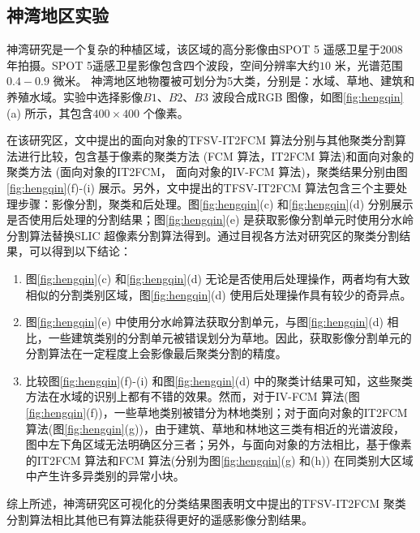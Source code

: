 \subsection{神湾地区实验}
\label{subsec::chap04-4-1}
神湾研究是一个复杂的种植区域，该区域的高分影像由SPOT 5 遥感卫星于2008 年拍摄。SPOT 5遥感卫星影像包含四个波段，空间分辨率大约$10$ 米，光谱范围$0.4-0.9$ 微米。 神湾地区地物覆被可划分为5大类，分别是：水域、草地、建筑和养殖水域。实验中选择影像$B1$、$B2$、$B3$ 波段合成RGB 图像，如图\ref{fig:hengqin}(a) 所示，其包含$400 \times 400$ 个像素。

在该研究区，文中提出的面向对象的TFSV-IT2FCM 算法分别与其他聚类分割算法进行比较，包含基于像素的聚类方法 (FCM 算法，IT2FCM 算法)和面向对象的聚类方法 (面向对象的IT2FCM， 面向对象的IV-FCM 算法)，聚类结果分别由图\ref{fig:hengqin}(f)-(i) 展示。另外，文中提出的TFSV-IT2FCM 算法包含三个主要处理步骤：影像分割，聚类和后处理。图\ref{fig:hengqin}(c) 和\ref{fig:hengqin}(d) 分别展示是否使用后处理的分割结果；图\ref{fig:hengqin}(e) 是获取影像分割单元时使用分水岭分割算法替换SLIC 超像素分割算法得到。通过目视各方法对研究区的聚类分割结果，可以得到以下结论：

\begin{enumerate}[(1)]
    \item 图\ref{fig:hengqin}(c) 和\ref{fig:hengqin}(d) 无论是否使用后处理操作，两者均有大致相似的分割类别区域，图\ref{fig:hengqin}(d) 使用后处理操作具有较少的奇异点。
    \item 图\ref{fig:hengqin}(e) 中使用分水岭算法获取分割单元，与图\ref{fig:hengqin}(d) 相比，一些建筑类别的分割单元被错误划分为草地。因此，获取影像分割单元的分割算法在一定程度上会影像最后聚类分割的精度。
    \item 比较图\ref{fig:hengqin}(f)-(i) 和图\ref{fig:hengqin}(d) 中的聚类计结果可知，这些聚类方法在水域的识别上都有不错的效果。然而，对于IV-FCM 算法(图\ref{fig:hengqin}(f))，一些草地类别被错分为林地类别；对于面向对象的IT2FCM 算法(图\ref{fig:hengqin}(g))，由于建筑、草地和林地这三类有相近的光谱波段，图中左下角区域无法明确区分三者；另外，与面向对象的方法相比，基于像素的IT2FCM 算法和FCM 算法(分别为图\ref{fig:hengqin}(g) 和(h)) 在同类别大区域中产生许多异类别的异常小块。
\end{enumerate}
综上所述，神湾研究区可视化的分类结果图表明文中提出的TFSV-IT2FCM 聚类分割算法相比其他已有算法能获得更好的遥感影像分割结果。


